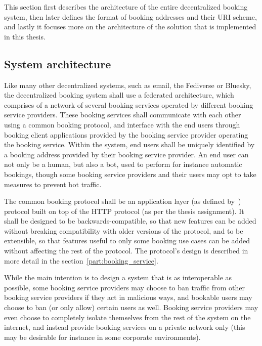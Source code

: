 
This section first describes the architecture of the entire decentralized booking system, then later defines the format of booking addresses and their URI scheme, and lastly it focuses more on the architecture of the solution that is implemented in this thesis.

\subsection{System architecture}

Like many other decentralized systems, such as email, the Fediverse or Bluesky, the decentralized booking system shall use a federated architecture, which comprises of a network of several booking services operated by different booking service providers. These booking services shall communicate with each other using a common booking protocol, and interface with the end users through booking client applications provided by the booking service provider operating the booking service. Within the system, end users shall be uniquely identified by a booking address provided by their booking service provider. An end user can not only be a human, but also a bot, used to perform for instance automatic bookings, though some booking service providers and their users may opt to take measures to prevent bot traffic.

The common booking protocol shall be an application layer (as defined by~\cite{iso7498}) protocol built on top of the HTTP protocol (as per the thesis assignment). It shall be designed to be backwards-compatible, so that new features can be added without breaking compatibility with older versions of the protocol, and to be extensible, so that features useful to only some booking use cases can be added without affecting the rest of the protocol. The protocol's design is described in more detail in the section~\ref{part:booking_service}.

While the main intention is to design a system that is as interoperable as possible, some booking service providers may choose to ban traffic from other booking service providers if they act in malicious ways, and bookable users may choose to ban (or only allow) certain users as well. Booking service providers may even choose to completely isolate themselves from the rest of the system on the internet, and instead provide booking services on a private network only (this may be desirable for instance in some corporate environments).

